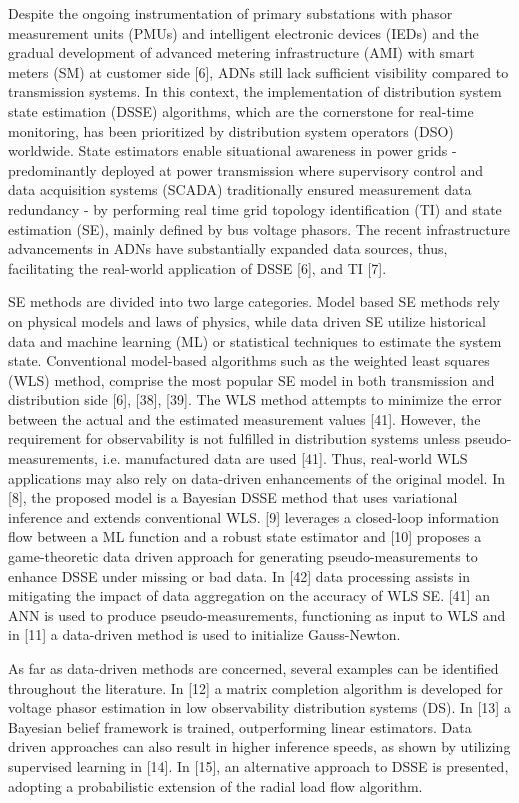 \documentclass[journal]{IEEEtran}  %
\begin{document}
Despite the ongoing instrumentation of primary substations with phasor measurement units (PMUs) and intelligent electronic devices (IEDs) and the gradual development of advanced metering infrastructure (AMI) with smart meters (SM) at customer side [6], ADNs still lack sufficient visibility compared to transmission systems. In this context, the implementation of distribution system state estimation (DSSE) algorithms, which are the cornerstone for real-time monitoring, has been prioritized by distribution system operators (DSO) worldwide. State estimators enable situational awareness in power grids - predominantly deployed at power transmission where supervisory control and data acquisition systems (SCADA) traditionally ensured measurement data redundancy - by performing real time grid topology identification (TI) and state estimation (SE), mainly defined by bus voltage phasors. The recent infrastructure advancements in ADNs have substantially expanded data sources, thus, facilitating the real-world application of DSSE [6], and TI [7].

SE methods are divided into two large categories. Model based SE methods rely on physical models and laws of physics, while data driven SE utilize historical data and machine learning (ML) or statistical techniques to estimate the system state. Conventional model-based algorithms such as the weighted least squares (WLS) method, comprise the most popular SE model in both transmission and distribution side [6], [38], [39]. The WLS method attempts to minimize the error between the actual and the estimated measurement values [41]. However, the requirement for observability is not fulfilled in distribution systems unless pseudo-measurements, i.e. manufactured data are used [41]. Thus, real-world WLS applications may also rely on data-driven enhancements of the original model. In [8], the proposed model is a Bayesian DSSE method that uses variational inference and extends conventional WLS. [9] leverages a closed-loop information flow between a ML function and a robust state estimator and [10] proposes a game-theoretic data driven approach for generating pseudo-measurements to enhance DSSE under missing or bad data. In [42] data processing assists in mitigating the impact of data aggregation on the accuracy of WLS SE. [41] an ANN is used to produce pseudo-measurements, functioning as input to WLS and in [11] a data-driven method is used to initialize Gauss-Newton.

As far as data-driven methods are concerned, several examples can be identified throughout the literature. In [12] a matrix completion algorithm is developed for voltage phasor estimation in low observability distribution systems (DS). In [13] a Bayesian belief framework is trained, outperforming linear estimators. Data driven approaches can also result in higher inference speeds, as shown by utilizing supervised learning in [14]. In [15], an alternative approach to DSSE is presented, adopting a probabilistic extension of the radial load flow algorithm.
\end{document}
